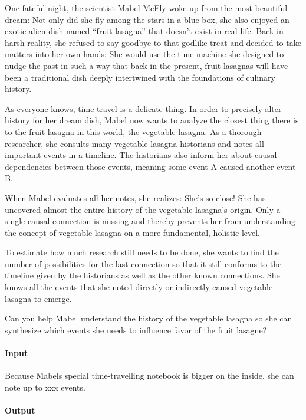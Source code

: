 



\makeheader


One fateful night, the scientist Mabel McFly woke up from the most beautiful dream: Not only did she fly among the stars in a blue box, she also enjoyed an exotic alien dish named “fruit lasagna” that doesn’t exist in real life. Back in harsh reality, she refused to say goodbye to that godlike treat and decided to take matters into her own hands: She would use the time machine she designed to nudge the past in such a way that back in the present, fruit lasagnas will have been a traditional dish deeply intertwined with the foundations of culinary history.

As everyone knows, time travel is a delicate thing. In order to precisely alter history for her dream dish, Mabel now wants to analyze the closest thing there is to the fruit lasagna in this world, the vegetable lasagna.
As a thorough researcher, she consults many vegetable lasagna historians and notes all important events in a timeline. The historians also inform her about causal dependencies between those events, meaning some event A caused another event B.

When Mabel evaluates all her notes, she realizes: She’s so close! She has uncovered almost the entire history of the vegetable lasagna’s origin. Only a single causal connection is missing and thereby prevents her from understanding the concept of vegetable lasagna on a more fundamental, holistic level.

To estimate how much research still needs to be done, she wants to find the number of possibilities for the last connection so that it still conforms to the timeline given by the historians as well as the other known connections. She knows all the events that she noted directly or indirectly caused vegetable lasagna to emerge.

Can you help Mabel understand the history of the vegetable lasagna so she can synthesize which events she needs to influence favor of the fruit lasagne?

\paragraph*{Input}

Because Mabels special time-travelling notebook is bigger on the inside, she can note up to xxx events.


\paragraph*{Output}


\begin{samples}
\end{samples}


